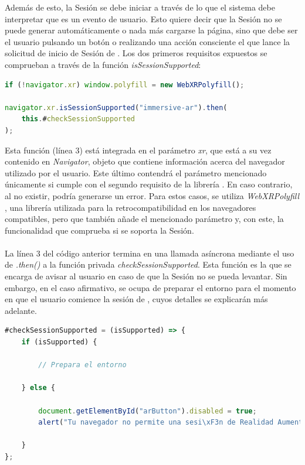 \documentclass{subfiles}
\begin{document}
        Además de esto, la Sesión se debe iniciar a través de lo que el sistema debe interpretar que es un evento de usuario. Esto quiere decir que la Sesión no se puede generar automáticamente o nada más cargarse la página, sino que debe ser el usuario pulsando un botón o realizando una acción consciente el que lance la solicitud de inicio de Sesión de \ra. Los dos primeros requisitos expuestos se comprueban a través de la función \textit{isSessionSupported}:

\begin{lstlisting}[language=JavaScript, caption={Uso de \textit{isSessionSupported en la aplicación}.}, label={lst:2.1}]
if (!navigator.xr) window.polyfill = new WebXRPolyfill();

navigator.xr.isSessionSupported("immersive-ar").then(
    this.#checkSessionSupported
);
\end{lstlisting}

        Esta función (línea 3) está integrada en el parámetro \textit{xr}, que está a su vez contenido en \textit{Navigator}, objeto que contiene información acerca del navegador utilizado por el usuario. Este último contendrá el parámetro mencionado únicamente si cumple con el segundo requisito de la librería \webxr. En caso contrario, al no existir, podría generarse un error. Para estos casos, se utiliza \textit{WebXRPolyfill} \cite{web:webxrpolyfill}, una librería utilizada para la retrocompatibilidad en los navegadores compatibles, pero que también añade el mencionado parámetro y, con este, la funcionalidad que comprueba si se soporta la Sesión.

        \paragraph{}
        La línea 3 del código anterior termina en una llamada asíncrona mediante el uso de \textit{.then()} a la función privada \textit{checkSessionSupported}. Esta función es la que se encarga de avisar al usuario en caso de que la Sesión no se pueda levantar. Sin embargo, en el caso afirmativo, se ocupa de preparar el entorno para el momento en que el usuario comience la sesión de \ra, cuyos detalles se explicarán más adelante.

\begin{lstlisting}[language=JavaScript, caption={Control de la Sesión, dependiendo de si es o no soportada.}, label={lst:2.2}]
#checkSessionSupported = (isSupported) => {
    if (isSupported) {
    
        // Prepara el entorno
    
    } else {
    
        document.getElementById("arButton").disabled = true;
        alert("Tu navegador no permite una sesi\xF3n de Realidad Aumentada.");
        
    }
};
\end{lstlisting}
\end{document}
